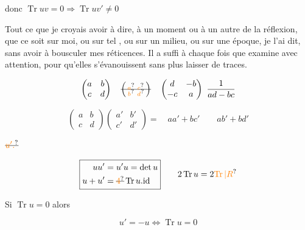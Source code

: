 donc \quad $\operatorname{Tr}uv=0\Longrightarrow\operatorname{Tr}uv'\ne0$


Tout ce que je croyais avoir à dire, à un moment ou à un autre de la réflexion, que ce soit sur moi, ou sur tel , ou sur un milieu, ou sur\unsure{,} une époque, je l'ai dit, sans  avoir à bousculer mes réticences.  Il a suffi à chaque fois que  examine avec attention,  pour qu'elles s'évanouissent\deleted{\unsure{,}} sans plus laisser de traces.

\[
\begin{pmatrix}a&b\\c&d\end{pmatrix}\quad
\deleted{\left(\begin{smallmatrix}\unsure{a}&\unsure{c}\\[-2pt]\unsure{b}&\unsure{d}\end{smallmatrix}\right)}\quad
\begin{pmatrix}d&-b\\-c&a\end{pmatrix}\ \frac{1}{ad-bc}
\]

\[
\begin{pmatrix}a&b\\c&d\end{pmatrix}
\begin{pmatrix}a'&b'\\c'&d'\end{pmatrix}
=\quad aa'+bc'\qquad ab'+bd'
\]

$\deleted{\unsure{u'.}}$

\[
\boxed{\begin{aligned}uu'&=u'u=\det u\\u+u'&=\deleted{\unsure{4}}\operatorname{Tr}u.\mathrm{id}\end{aligned}}
\qquad 2\operatorname{Tr}u=2\unsure{\operatorname{Tr}|R}
\]

 Si $\operatorname{Tr}u=0$ alors

\[
u'=-u\Longleftrightarrow\operatorname{Tr}u=0
\]

